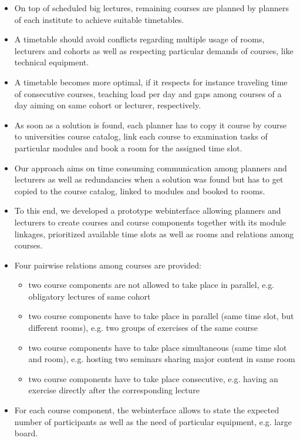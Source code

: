 \documentclass{easychair}
\begin{document}
\begin{itemize}
  \item%
  On top of scheduled big lectures, remaining courses are planned by planners of each institute to achieve suitable timetables. 
  \item%
  A timetable should avoid conflicts regarding multiple usage of rooms, lecturers and cohorts as well as respecting particular demands of courses, like technical equipment.
  \item%
  A timetable becomes more optimal, if it respects for instance traveling time of consecutive courses, teaching load per day and gaps among courses of a day aiming on same cohort or lecturer, respectively. 
  \item%
  As soon as a solution is found, each planner has to copy it course by course to universities course catalog, link each course to examination tasks of particular modules and book a room for the assigned time slot. \\
  \item%
  Our approach aims on time consuming communication among planners and lecturers as well as redundancies when a solution was found but has to get copied to the course catalog, linked to modules and booked to rooms. 
  \item%
  To this end, we developed a prototype webinterface allowing planners and lecturers to create courses and course components together with its module linkages, prioritized available time slots as well as rooms and relations among courses. 
  \item%
  Four pairwise relations among courses are provided:
  \begin{itemize}
    \item two course components are not allowed to take place in parallel, e.g. obligatory lectures of same cohort
    \item two course components have to take place in parallel (same time slot, but different rooms), e.g. two groups of exercises of the same course
    \item two course components have to take place simultaneous (same time slot and room), e.g. hosting two seminars sharing major content in same room
    \item two course components have to take place consecutive, e.g. having an exercise directly after the corresponding lecture 
  \end{itemize}
  \item%
  For each course component, the webinterface allows to state the expected number of participants as well as the need of particular equipment, e.g. large board.  

\end{itemize}
\end{document}

